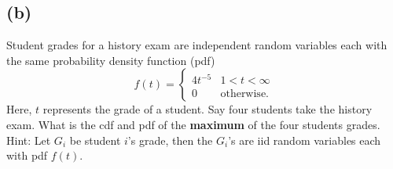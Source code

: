 \documentclass{article}
\begin{document}
{\subsection*{(b)}
Student grades for a history exam are independent random variables each with the same probability density function (pdf)
\[f(t)=\begin{cases}4t^{-5}& 1<t<\infty\\ 0& \text{otherwise.}  \end{cases}\]
Here, $t$ represents the grade of a student.  Say four students  take  the history exam. What is the cdf and pdf  of the {\bf{maximum}} of the four students grades. Hint: Let $G_i$ be student $i$'s grade, then the  $G_i$'s are iid random variables each with pdf $f(t)$. \\ \\ 


}
\end{document}

